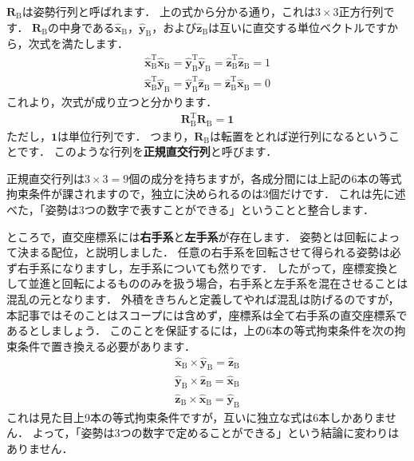 ﻿\documentclass[a4paper]{jsarticle}
\begin{document}
$\boldsymbol{R}_{\mathrm{B}}$は姿勢行列と呼ばれます．
上の式から分かる通り，これは$3\times 3$正方行列です．
$\boldsymbol{R}_{\mathrm{B}}$の中身である$\hat{\boldsymbol{x}}_{\mathrm{B}}$，$\hat{\boldsymbol{y}}_{\mathrm{B}}$，および$\hat{\boldsymbol{z}}_{\mathrm{B}}$は互いに直交する単位ベクトルですから，次式を満たします．
\begin{align*}
\hat{\boldsymbol{x}}_{\mathrm{B}}^{\mathrm{T}}
\hat{\boldsymbol{x}}_{\mathrm{B}}
=
\hat{\boldsymbol{y}}_{\mathrm{B}}^{\mathrm{T}}
\hat{\boldsymbol{y}}_{\mathrm{B}}
=
\hat{\boldsymbol{z}}_{\mathrm{B}}^{\mathrm{T}}
\hat{\boldsymbol{z}}_{\mathrm{B}}
=1
\\
\hat{\boldsymbol{x}}_{\mathrm{B}}^{\mathrm{T}}
\hat{\boldsymbol{y}}_{\mathrm{B}}
=
\hat{\boldsymbol{y}}_{\mathrm{B}}^{\mathrm{T}}
\hat{\boldsymbol{z}}_{\mathrm{B}}
=
\hat{\boldsymbol{z}}_{\mathrm{B}}^{\mathrm{T}}
\hat{\boldsymbol{x}}_{\mathrm{B}}
=0
\end{align*}
これより，次式が成り立つと分かります．
\begin{align*}
\boldsymbol{R}_{\mathrm{B}}^{\mathrm{T}}\boldsymbol{R}_{\mathrm{B}}=\boldsymbol{1}
\end{align*}
ただし，$\boldsymbol{1}$は単位行列です．
つまり，$\boldsymbol{R}_{\mathrm{B}}$は転置をとれば逆行列になるということです．
このような行列を{\bf 正規直交行列}と呼びます．

正規直交行列は$3\times 3=9$個の成分を持ちますが，各成分間には上記の6本の等式拘束条件が課されますので，独立に決められるのは3個だけです．
これは先に述べた，「姿勢は3つの数字で表すことができる」ということと整合します．

ところで，直交座標系には{\bf 右手系}と{\bf 左手系}が存在します．
姿勢とは回転によって決まる配位，と説明しました．
任意の右手系を回転させて得られる姿勢は必ず右手系になりますし，左手系についても然りです．
したがって，座標変換として並進と回転によるもののみを扱う場合，右手系と左手系を混在させることは混乱の元となります．
外積をきちんと定義してやれば混乱は防げるのですが，本記事ではそのことはスコープには含めず，座標系は全て右手系の直交座標系であるとしましょう．
このことを保証するには，上の6本の等式拘束条件を次の拘束条件で置き換える必要があります．
\begin{align*}
\hat{\boldsymbol{x}}_{\mathrm{B}}
\times
\hat{\boldsymbol{y}}_{\mathrm{B}}
=
\hat{\boldsymbol{z}}_{\mathrm{B}}
\\
\hat{\boldsymbol{y}}_{\mathrm{B}}
\times
\hat{\boldsymbol{z}}_{\mathrm{B}}
=
\hat{\boldsymbol{x}}_{\mathrm{B}}
\\
\hat{\boldsymbol{z}}_{\mathrm{B}}
\times
\hat{\boldsymbol{x}}_{\mathrm{B}}
=
\hat{\boldsymbol{y}}_{\mathrm{B}}
\end{align*}
これは見た目上9本の等式拘束条件ですが，互いに独立な式は6本しかありません．
よって，「姿勢は3つの数字で定めることができる」という結論に変わりはありません．
\end{document}
